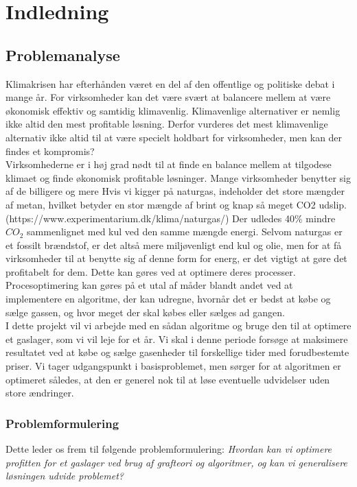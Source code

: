 \chapter{Indledning}
\section{Problemanalyse}
Klimakrisen har efterhånden været en del af den offentlige og politiske debat i mange år. For virksomheder kan det være svært at balancere mellem at være økonomisk effektiv og samtidig klimavenlig. Klimavenlige alternativer er nemlig ikke altid den mest profitable løsning. Derfor vurderes det mest klimavenlige alternativ ikke altid til at være specielt holdbart for virksomheder, men kan der findes et kompromis? 
\\
Virksomhederne er i høj grad nødt til at finde en balance mellem at tilgodese klimaet og finde økonomisk profitable løsninger. Mange virksomheder benytter sig af de billigere og mere
Hvis vi kigger på naturgas, indeholder det store mængder af metan, hvilket betyder en stor mængde af brint og knap så meget CO2 udslip. (https://www.experimentarium.dk/klima/naturgas/) Der udledes 40$\%$ mindre $CO_{2}$ sammenlignet med kul ved den samme mængde energi. Selvom naturgas er et fossilt brændstof, er det altså mere miljøvenligt end kul og olie, men for at få virksomheder til at benytte sig af denne form for energ, er det vigtigt at gøre det profitabelt for dem. Dette kan gøres ved at optimere deres processer.
Procesoptimering kan gøres på et utal af måder blandt andet ved at implementere en algoritme, der kan udregne, hvornår det er bedst at købe og sælge gassen, og hvor meget der skal købes eller sælges ad gangen. 
\\

I dette projekt vil vi arbejde med en sådan algoritme og bruge den til at optimere et gaslager, som vi vil leje for et år. Vi skal i denne periode forsøge at maksimere resultatet ved at købe og sælge gasenheder til forskellige tider med forudbestemte priser. Vi tager udgangspunkt i basisproblemet, men sørger for at algoritmen er optimeret således, at den er generel nok til at løse eventuelle udvidelser uden store ændringer.

\subsection{Problemformulering}
Dette leder os frem til følgende problemformulering:
\textit{Hvordan kan vi optimere profitten for et gaslager ved brug af grafteori og algoritmer, og kan vi generalisere løsningen udvide problemet?}

